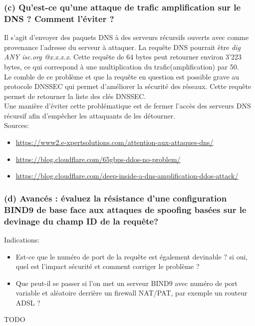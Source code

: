 \documentclass{article}
\begin{document}
\subsubsection*{(c) Qu’est-ce qu’une attaque de trafic amplification sur le DNS ? Comment l’éviter ?}
Il s'agit d'envoyer des paquets DNS à des serveurs récursifs ouverts avec comme provenance l'adresse du serveur à attaquer. La requête DNS pourrait être \textit{dig ANY isc.org @x.x.x.x}. Cette requête de 64 bytes peut retourner environ 3'223 bytes, ce qui correspond à une multiplication du  trafic(amplification) par 50.\\

Le comble de ce problème et que la requête en question est possible grave au protocole DNSSEC qui permet d'améliorer la sécurité des réseaux. Cette requête permet de retourner la liste des clés DNSSEC.\\

Une manière d'éviter cette problématique est de fermer l'accès des serveurs DNS récursif afin d'empêcher les attaquants de les détourner.\\

Sources:
\begin{itemize}
\item \url{https://www2.e-xpertsolutions.com/attention-aux-attaques-dns/}
\item \url{https://blog.cloudflare.com/65gbps-ddos-no-problem/}
\item \url{https://blog.cloudflare.com/deep-inside-a-dns-amplification-ddos-attack/}
\end{itemize}

\subsubsection*{(d) Avancés : évaluez la résistance d’une configuration BIND9 de base face aux attaques de spoofing basées sur le devinage du champ ID de la requête?}
Indications:
\begin{itemize}
\item Est-ce que le numéro de port de la requête est également devinable ? si oui, quel est l’impact sécurité et comment corriger le problème ?
\item Que peut-il se passer si l’on met un serveur BIND9 avec numéro de port variable et aléatoire derrière un firewall NAT/PAT, par exemple un routeur ADSL ?
\end{itemize}

TODO\\
\end{document}
